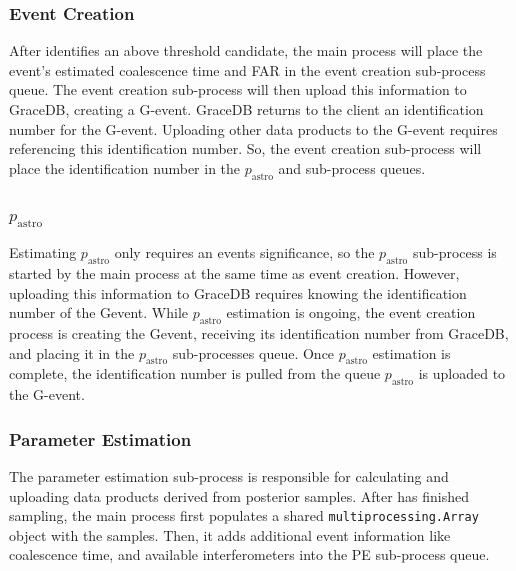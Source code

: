 \begin{refsection}

 

\subsubsection{Event Creation}
After \aframe identifies an above threshold candidate, the main process will place the event's estimated coalescence time and FAR in the event creation sub-process queue. 
The event creation sub-process will then upload this information to GraceDB, creating a G-event. 
GraceDB returns to the client an identification number for the G-event. 
Uploading other data products to the G-event requires referencing this identification number. 
So, the event creation sub-process will place the identification number in the $p_{\mathrm{astro}}$ and \amplfi sub-process queues.

\subsubsection{$p_{\mathrm{astro}}$}
Estimating $p_{\mathrm{astro}}$ only requires an events significance, so the $p_{\mathrm{astro}}$ sub-process is started by the main process at the same time as event creation. 
However, uploading this information to GraceDB requires knowing the identification number of the Gevent. 
While $p_{\mathrm{astro}}$ estimation is ongoing, the event creation process is creating the Gevent, receiving its identification number from GraceDB, and placing it in the $p_{\mathrm{astro}}$ sub-processes queue. 
Once $p_{\mathrm{astro}}$ estimation is complete, the identification number is pulled from the queue $p_{\mathrm{astro}}$ is uploaded to the G-event. 

\subsubsection{Parameter Estimation}
The parameter estimation sub-process is responsible for calculating and uploading data products derived from posterior samples. 
After \amplfi has finished sampling, the main process first populates a shared \texttt{multiprocessing.Array} object with the samples. 
Then, it adds additional event information like coalescence time, and available interferometers into the PE sub-process queue. 


\end{refsection}
